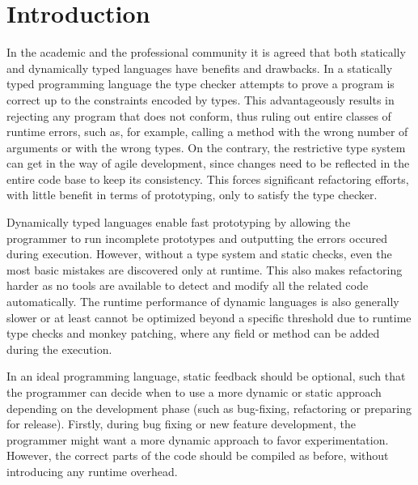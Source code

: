  \section{Introduction}

In the academic and the professional community it is agreed that both statically and dynamically typed languages have benefits and drawbacks. In a statically typed programming language the type checker attempts to prove a program is correct up to the constraints encoded by types.
This advantageously results in rejecting any program that does not conform, thus ruling out entire classes of runtime errors, such as, for example, calling a method with the wrong number of arguments or with the wrong types. On the contrary, the restrictive type system can get in the way of agile development, since changes need to be reflected in the entire code base to keep its consistency. This forces significant refactoring efforts, with little benefit in terms of prototyping, only to satisfy the type checker.

 Dynamically typed languages enable fast prototyping by allowing the programmer to run incomplete prototypes and outputting the errors occured during execution. However, without a type system and static checks, even the most basic mistakes are discovered only at runtime. This also makes refactoring harder as no tools are available to detect and modify all the related code automatically. The runtime performance of dynamic languages is also generally slower or at least cannot be optimized beyond a specific threshold due to runtime type checks and monkey patching, where any field or method can be added during the execution.


In an ideal programming language, static feedback should be optional, such that the programmer can decide when to use a more dynamic or static approach depending on the development phase (such as bug-fixing, refactoring or preparing for release). Firstly, during bug fixing or new feature development, the programmer might want a more dynamic approach to favor experimentation. However, the correct parts of the code should be compiled as before, without introducing any runtime overhead.

